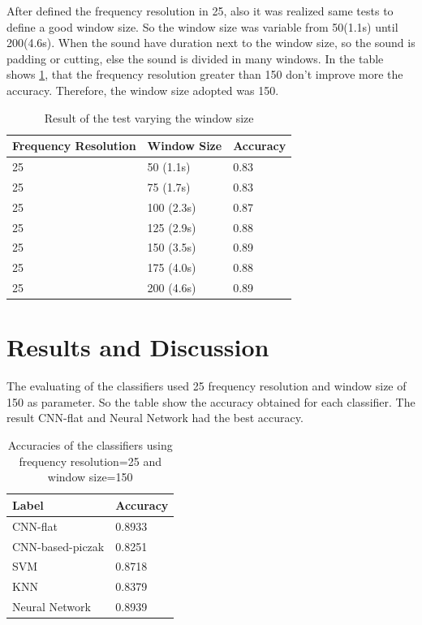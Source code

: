 \documentclass[12pt,oneside,a4paper]{article}
\begin{document}
After defined the frequency resolution in 25, also it was realized same tests to define a good window size. So the window size was variable from 50(1.1s) until 200(4.6s). When the sound have duration next to the window size, so the sound is padding or cutting, else the sound is divided in many windows. In the table shows \ref{tab:window}, that the frequency resolution greater than 150 don't improve more the accuracy. Therefore, the window size adopted was 150.

\begin{table}[H]
	\centering
	\begin{tabular}{@{}lll@{}}
		\toprule
		Frequency Resolution  &   Window Size    & Accuracy   \\ \midrule
		25                    & 50   (1.1s)      & 0.83     \\
		25                    & 75   (1.7s)      & 0.83     \\
		25                    & 100  (2.3s)      & 0.87     \\
		25                    & 125  (2.9s)      & 0.88     \\
		25                    & 150  (3.5s)      & 0.89     \\
		25                    & 175  (4.0s)      & 0.88     \\
		25                    & 200  (4.6s)      & 0.89     \\  \bottomrule
	\end{tabular}
	\label{tab:window}
	\caption{Result of the test varying the window size}
\end{table}



\section{Results and Discussion}

The evaluating of the classifiers used 25 frequency resolution and window size of 150 as parameter. So the table show the accuracy obtained for each classifier. The result CNN-flat and Neural Network had the best accuracy.

\begin{table}[H]
	\centering
	\begin{tabular}{@{}ll@{}}
		\toprule
		Label              & Accuracy   \\ \midrule
		CNN-flat           & 0.8933     \\
		CNN-based-piczak   & 0.8251     \\
		SVM                & 0.8718     \\
		KNN                & 0.8379     \\
		Neural Network     & 0.8939     \\ \bottomrule
	\end{tabular}
	\caption{Accuracies of the classifiers using frequency resolution=25 and window size=150}
\end{table}
\end{document}
